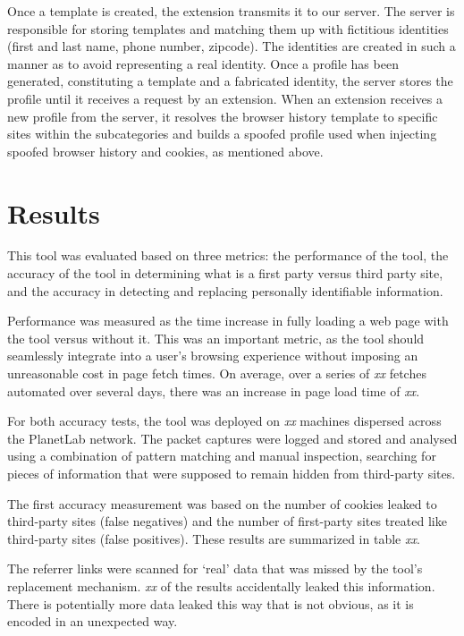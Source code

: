 \documentclass[11pt,twocolumn]{article}
\begin{document}
Once a template is created, the extension transmits it to our server. The server is responsible for storing templates and matching them up with fictitious identities (first and last name, phone number, zipcode). The identities are created in such a manner as to avoid representing a real identity. Once a profile has been generated, constituting a template and a fabricated identity, the server stores the profile until it receives a request by an extension. When an extension receives a new profile from the server, it resolves the browser history template to specific sites within the subcategories and builds a spoofed profile used when injecting spoofed browser history and cookies, as mentioned above. 


\section{Results}
This tool was evaluated based on three metrics: the performance of the tool, the accuracy of the tool in determining what is a first party versus third party site, and the accuracy in detecting and replacing personally identifiable information.

Performance was measured as the time increase in fully loading a web page with the tool versus without it.  This was an important metric, as the tool should seamlessly integrate into a user's browsing experience without imposing an unreasonable cost in page fetch times.  On average, over a series of \textit{xx} fetches automated over several days, there was an increase in page load time of \textit{xx}.

For both accuracy tests, the tool was deployed on \textit{xx} machines dispersed across the PlanetLab network.  The packet captures were logged and stored and analysed using a combination of pattern matching and manual inspection, searching for pieces of information that were supposed to remain hidden from third-party sites.

The first accuracy measurement was based on the number of cookies leaked to third-party sites (false negatives) and the number of first-party sites treated like third-party sites (false positives).  These results are summarized in table \textit{xx}.

The referrer links were scanned for `real' data that was missed by the tool's replacement mechanism.  \textit{xx} of the results accidentally leaked this information.  There is potentially more data leaked this way that is not obvious, as it is encoded in an unexpected way.
\end{document}
